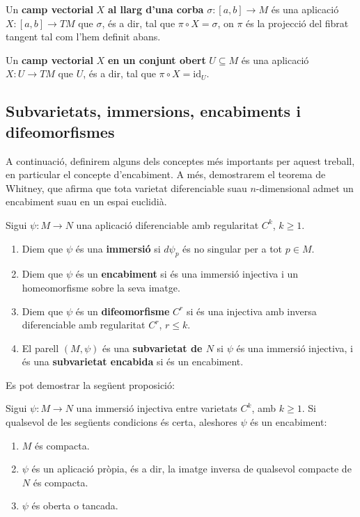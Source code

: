 \begin{defi}
    Un \textbf{camp vectorial} $X$ \textbf{al llarg d'una corba} $\sigma:[a,b]\to M$ és una aplicació $X:[a,b]\to TM$ que  $\sigma$, és a dir, tal que $\pi\circ X = \sigma$, on $\pi$ és la projecció del fibrat tangent tal com l'hem definit abans. 

    Un \textbf{camp vectorial} $X$ \textbf{en un conjunt obert} $U\subseteq M$ és una aplicació $X:U\to TM$ que  $U$, és a dir, tal que $\pi\circ X = \text{id}_U$.
\end{defi}


\subsection{Subvarietats, immersions, encabiments i difeomorfismes}
A continuació, definirem alguns dels conceptes més importants per aquest treball, en particular el concepte d'encabiment. A més, demostrarem el teorema de Whitney, que afirma que tota varietat diferenciable suau $n$-dimensional admet un encabiment suau en un espai euclidià. 
\begin{defi}
    Sigui $\psi:M\to N$ una aplicació diferenciable amb regularitat $C^k$, $k\ge 1$.
    \begin{enumerate}
        \item Diem que $\psi$ és una \textbf{immersió} si $d\psi_p$ és no singular per a tot $p\in M$.
        \item Diem que $\psi$ és un \textbf{encabiment} si és una immersió injectiva i un homeomorfisme sobre la seva imatge.
        \item Diem que $\psi$ és un \textbf{difeomorfisme} $C^r$ si és una injectiva amb inversa diferenciable amb regularitat $C^r$, $r\le k$.
        \item El parell $(M, \psi)$ és una \textbf{subvarietat de $N$} si $\psi$ és una immersió injectiva, i és una \textbf{subvarietat encabida} si és un encabiment.
    \end{enumerate}
\end{defi}

Es pot demostrar la següent proposició:
\begin{prop}\label{prop:encabiment_immersio}
    Sigui $\psi:M\to N$ una immersió injectiva entre varietats $C^k$, amb $k\ge 1$. Si qualsevol de les següents condicions és certa, aleshores $\psi$ és un encabiment:
    \begin{enumerate}
        \item $M$ és compacta.
        \item $\psi$ és un aplicació pròpia, és a dir, la imatge inversa de qualsevol compacte de $N$ és compacta.
        \item $\psi$ és oberta o tancada.
    \end{enumerate}
\end{prop}

